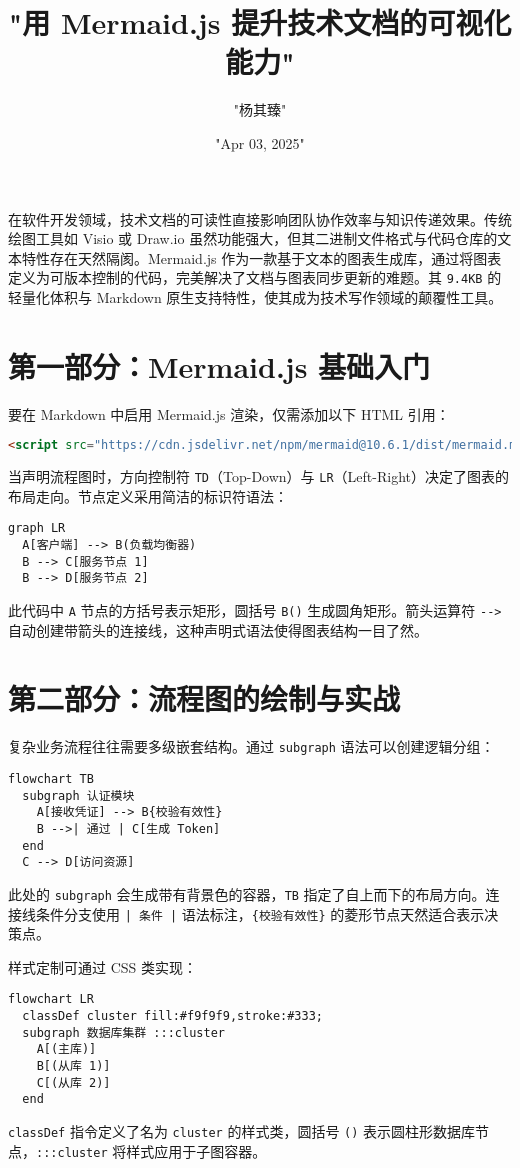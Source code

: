 \title{"用 Mermaid.js 提升技术文档的可视化能力"}
\author{"杨其臻"}
\date{"Apr 03, 2025"}
\maketitle
在软件开发领域，技术文档的可读性直接影响团队协作效率与知识传递效果。传统绘图工具如 Visio 或 Draw.io 虽然功能强大，但其二进制文件格式与代码仓库的文本特性存在天然隔阂。Mermaid.js 作为一款基于文本的图表生成库，通过将图表定义为可版本控制的代码，完美解决了文档与图表同步更新的难题。其 \verb!9.4KB! 的轻量化体积与 Markdown 原生支持特性，使其成为技术写作领域的颠覆性工具。\par
\chapter{第一部分：Mermaid.js 基础入门}
要在 Markdown 中启用 Mermaid.js 渲染，仅需添加以下 HTML 引用：\par
\begin{lstlisting}[language=html]
<script src="https://cdn.jsdelivr.net/npm/mermaid@10.6.1/dist/mermaid.min.js"></script>
\end{lstlisting}
当声明流程图时，方向控制符 \verb!TD!（Top-Down）与 \verb!LR!（Left-Right）决定了图表的布局走向。节点定义采用简洁的标识符语法：\par
\begin{lstlisting}[language=mermaid]
graph LR
  A[客户端] --> B(负载均衡器)
  B --> C[服务节点 1]
  B --> D[服务节点 2]
\end{lstlisting}
此代码中 \verb!A! 节点的方括号表示矩形，圆括号 \verb!B()! 生成圆角矩形。箭头运算符 \verb!-->! 自动创建带箭头的连接线，这种声明式语法使得图表结构一目了然。\par
\chapter{第二部分：流程图的绘制与实战}
复杂业务流程往往需要多级嵌套结构。通过 \verb!subgraph! 语法可以创建逻辑分组：\par
\begin{lstlisting}[language=mermaid]
flowchart TB
  subgraph 认证模块
    A[接收凭证] --> B{校验有效性}
    B -->| 通过 | C[生成 Token]
  end
  C --> D[访问资源]
\end{lstlisting}
此处的 \verb!subgraph! 会生成带有背景色的容器，\verb!TB! 指定了自上而下的布局方向。连接线条件分支使用 \verb!| 条件 |! 语法标注，\verb!{校验有效性}! 的菱形节点天然适合表示决策点。\par
样式定制可通过 CSS 类实现：\par
\begin{lstlisting}[language=mermaid]
flowchart LR
  classDef cluster fill:#f9f9f9,stroke:#333;
  subgraph 数据库集群 :::cluster
    A[(主库)]
    B[(从库 1)]
    C[(从库 2)]
  end
\end{lstlisting}
\verb!classDef! 指令定义了名为 \verb!cluster! 的样式类，圆括号 \verb!()! 表示圆柱形数据库节点，\verb!:::cluster! 将样式应用于子图容器。\par
